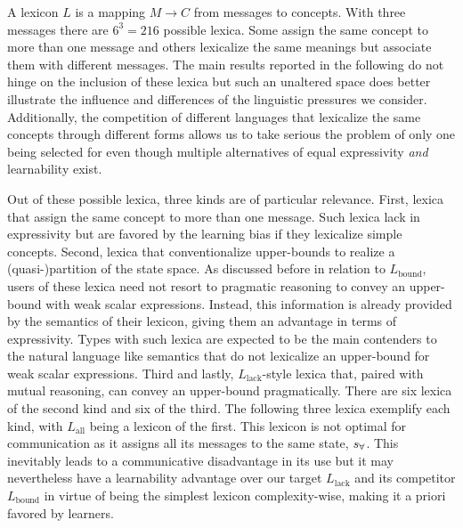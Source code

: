 \documentclass[a4paper]{article}
\newcommand{\state}{\ensuremath{s}\xspace}		%
\newcommand{\mystate}[1]{\ensuremath{\state_{\text{#1}}}\xspace} %
\newcommand{\mylang}[1]{\ensuremath{L_{\text{#1}}}\xspace} %
\newcommand{\Messgs}{\ensuremath{M}\xspace}		%
\newcommand{\sall}{\mystate{\ensuremath{\forall}}}
\newcommand{\Lall}{\mylang{all}}
\newcommand{\Lbound}{\mylang{bound}}
\newcommand{\Llack}{\mylang{lack}}
\begin{document}
A lexicon $L$ is a mapping $\Messgs \rightarrow C$ from messages to concepts. With three
messages there are $6^3 = 216$ possible lexica. Some assign the same concept to more than one message and others lexicalize the same meanings but associate them with different messages. The main results reported in the following do not hinge on the inclusion of these lexica but such an unaltered space does better illustrate the influence and differences of the linguistic pressures we consider. Additionally, the competition of different languages that lexicalize the same concepts through different forms allows us to take serious the problem of only one being selected for even though multiple alternatives of equal expressivity {\em and} learnability exist.

Out of these possible lexica, three kinds are of particular relevance. First, lexica that assign the same concept to more than one message. Such lexica lack in expressivity but are favored by the learning bias if they lexicalize simple concepts. Second, lexica that conventionalize upper-bounds to realize a (quasi-)partition of the state space. As discussed before in relation to $\Lbound$, users of these lexica need not resort to pragmatic reasoning to convey an upper-bound with weak scalar expressions. Instead, this information is already provided by the semantics of their lexicon, giving them an advantage in terms of expressivity. Types with such lexica are expected to be the main contenders to the natural language like semantics that do not lexicalize an upper-bound for weak scalar expressions. Third and lastly, $\Llack$-style lexica that, paired with mutual reasoning, can convey an upper-bound pragmatically. There are six lexica of the second kind and six of the third. The following three lexica exemplify each kind, with $\Lall$ being a lexicon of the first. This lexicon is not optimal for communication as it assigns all its messages to the same state, $\sall$. This inevitably leads to a communicative disadvantage in its use but it may nevertheless have a learnability advantage over our target $\Llack$ and its competitor $\Lbound$ in virtue of being the simplest lexicon complexity-wise, making it a priori favored by learners.
\end{document}
